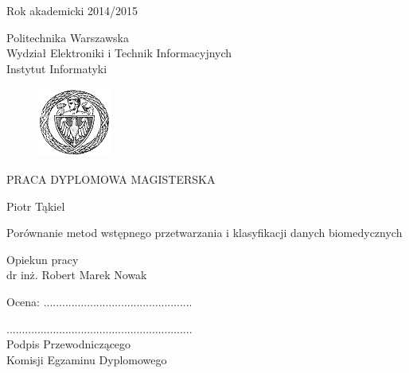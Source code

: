 \documentclass[../thesis.tex]{subfiles}
\begin{document}
\begin{titlepage} 

\hfill Rok akademicki 2014/2015 \\           	
\begin{flushleft}
\hspace*{18mm} Politechnika Warszawska \\
Wydział Elektroniki i Technik Informacyjnych \\
\hspace*{22mm} Instytut Informatyki \\
\end{flushleft}
\vspace{1.0cm}

\begin{figure}[h]
\centering
\includegraphics{logo_pw2.png}
\end{figure}
\vspace{1cm}

\begin{center}
\fontsize{16pt}{18pt}\selectfont
PRACA DYPLOMOWA MAGISTERSKA
\vspace{1.0cm}

\fontsize{14pt}{18pt}\selectfont
Piotr Tąkiel
\vspace{1.0cm}

\fontsize{20pt}{24pt}\selectfont
Porównanie metod wstępnego przetwarzania i klasyfikacji danych biomedycznych
\end{center}
\vspace{3cm}

\hspace*{112mm}Opiekun pracy \\
\hspace*{110mm}dr inż. Robert Marek Nowak \\
\vspace{2.5cm}

\begin{flushleft}
Ocena: ................................................ \\

\vspace{5mm}

............................................................ \\

\hspace*{10mm}Podpis Przewodniczącego \\
\hspace*{3mm}Komisji Egzaminu Dyplomowego
\end{flushleft}

\end{titlepage} 
\pagestyle{empty}
\cleardoublepage 
\end{document}
